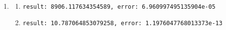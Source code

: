 \documentclass[11pt]{article}
\newcommand{\Newpage}{\end{preview}\begin{preview}}
\begin{document}
\begin{preview}
\begin{enumerate}
\begin{enumerate}
\begin{enumerate}
                  \end{enumerate}
            \item
                  \begin{enumerate}
                    \item \texttt{result: 8906.117634354589, error: 6.960997495135904e-05}
                    \item \texttt{result: 10.787064853079258, error: 1.1976047768013373e-13}
                  \end{enumerate}
          \end{enumerate}
  \end{enumerate}

  \Newpage


\end{preview}
\end{document}
